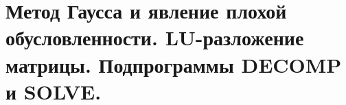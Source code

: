 \documentclass[../../calc-math-exam-2023.tex]{subfiles}
\begin{document}
    \section{Метод Гаусса и явление плохой обусловленности. \textbf{LU}-разложение матрицы. Подпрограммы \textbf{DECOMP} и \textbf{SOLVE}.}\label{sec:ch20}
\end{document}
